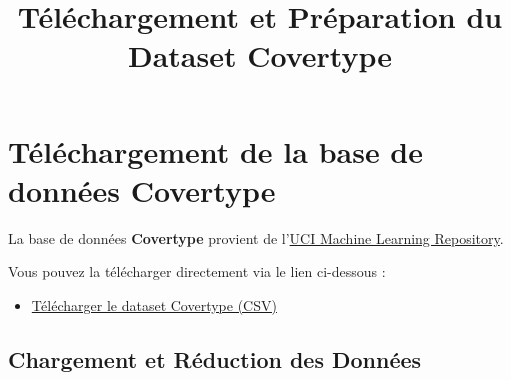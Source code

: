 \documentclass[
  letterpaper,
  DIV=11,
  numbers=noendperiod]{scrartcl}
\title{Téléchargement et Préparation du Dataset Covertype}
\author{}
\date{}
\providecommand{\tightlist}{%
  \setlength{\itemsep}{0pt}\setlength{\parskip}{0pt}}\usepackage{longtable,booktabs,array}
\begin{document}
\maketitle


\section{Téléchargement de la base de données
Covertype}\label{tuxe9luxe9chargement-de-la-base-de-donnuxe9es-covertype}

La base de données \textbf{Covertype} provient de
l'\href{https://archive.ics.uci.edu/ml/datasets/Covertype}{UCI Machine
Learning Repository}.

Vous pouvez la télécharger directement via le lien ci-dessous :

\begin{itemize}
\tightlist
\item
  \href{https://archive.ics.uci.edu/ml/machine-learning-databases/covtype/covtype.data.gz}{Télécharger
  le dataset Covertype (CSV)}
\end{itemize}

\subsection{Chargement et Réduction des
Données}\label{chargement-et-ruxe9duction-des-donnuxe9es}
\end{document}
